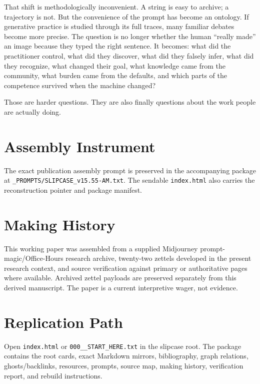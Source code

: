 \documentclass[11pt]{article}
\begin{document}
That shift is methodologically inconvenient. A string is easy to archive; a trajectory is not. But the convenience of the prompt has become an ontology. If generative practice is studied through its full traces, many familiar debates become more precise. The question is no longer whether the human ``really made'' an image because they typed the right sentence. It becomes: what did the practitioner control, what did they discover, what did they falsely infer, what did they recognize, what changed their goal, what knowledge came from the community, what burden came from the defaults, and which parts of the competence survived when the machine changed?

Those are harder questions. They are also finally questions about the work people are actually doing.

\printbibliography

\appendix
\small
\section{Assembly Instrument}
The exact publication assembly prompt is preserved in the accompanying package at \nolinkurl{_PROMPTS/SLIPCASE_v15.55-AM.txt}. The sendable \texttt{index.html} also carries the reconstruction pointer and package manifest.

\section{Making History}
This working paper was assembled from a supplied Midjourney prompt-magic/Office-Hours research archive, twenty-two zettels developed in the present research context, and source verification against primary or authoritative pages where available. Archived zettel payloads are preserved separately from this derived manuscript. The paper is a current interpretive wager, not evidence.

\section{Replication Path}
Open \texttt{index.html} or \texttt{000\_\_START\_HERE.txt} in the slipcase root. The package contains the root cards, exact Markdown mirrors, bibliography, graph relations, ghosts/backlinks, resources, prompts, source map, making history, verification report, and rebuild instructions.
\end{document}
